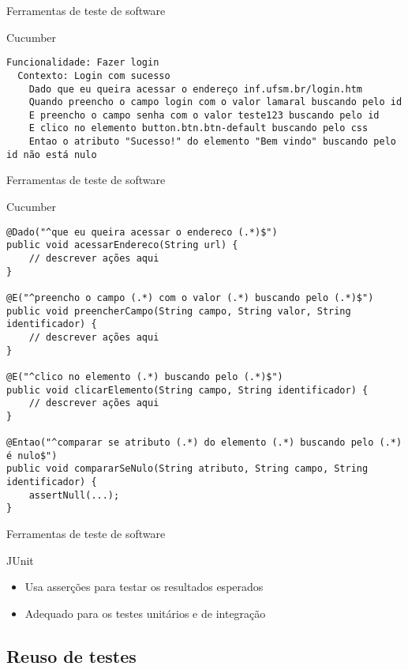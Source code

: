 \documentclass{beamer}
\begin{document}
\begin{frame}[fragile]{Ferramentas de teste de software}
    \item Cucumber
    \begin{lstlisting}
Funcionalidade: Fazer login
  Contexto: Login com sucesso
    Dado que eu queira acessar o endereço inf.ufsm.br/login.htm
    Quando preencho o campo login com o valor lamaral buscando pelo id
    E preencho o campo senha com o valor teste123 buscando pelo id
    E clico no elemento button.btn.btn-default buscando pelo css
    Entao o atributo "Sucesso!" do elemento "Bem vindo" buscando pelo id não está nulo
	\end{lstlisting}
\end{frame}
\begin{frame}[fragile]{Ferramentas de teste de software}
    \item Cucumber
    \begin{lstlisting}
@Dado("^que eu queira acessar o endereco (.*)$")
public void acessarEndereco(String url) {
    // descrever ações aqui
}

@E("^preencho o campo (.*) com o valor (.*) buscando pelo (.*)$")
public void preencherCampo(String campo, String valor, String identificador) {
    // descrever ações aqui
}

@E("^clico no elemento (.*) buscando pelo (.*)$")
public void clicarElemento(String campo, String identificador) {
    // descrever ações aqui
}

@Entao("^comparar se atributo (.*) do elemento (.*) buscando pelo (.*) é nulo$")
public void compararSeNulo(String atributo, String campo, String identificador) {
    assertNull(...);
}

	\end{lstlisting}
\end{frame}
\begin{frame}[fragile]{Ferramentas de teste de software}
    \item JUnit
	\begin{itemize}
		\item Usa asserções para testar os resultados esperados
        \item Adequado para os testes unitários e de integração
	\end{itemize}
\end{frame}
\subsection{Reuso de testes}
\end{document}
